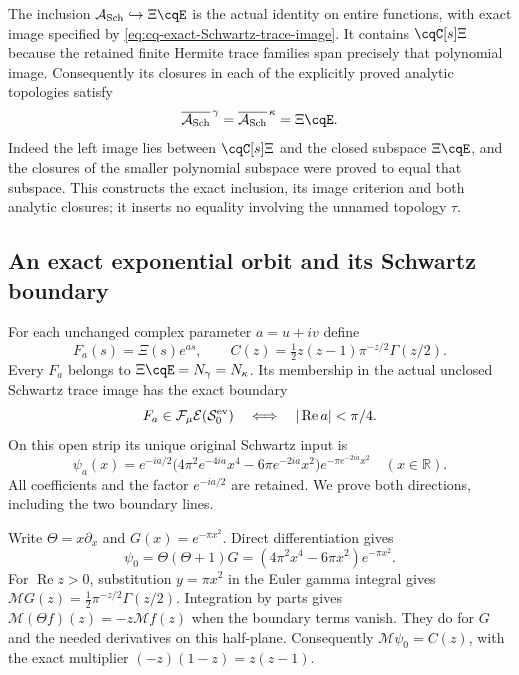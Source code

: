 The inclusion $\mathcal A_{\rm Sch}\hookrightarrow\Xi\cqE$
is the actual identity on entire functions, with exact image
specified by \eqref{eq:cq-exact-Schwartz-trace-image}. It contains
$\cqC[s]\Xi$ because the retained finite Hermite trace families
span precisely that polynomial image. Consequently its closures
in each of the explicitly proved analytic topologies satisfy
\begin{equation}\label{eq:cq-Schwartz-image-analytic-closures}
 \overline{\mathcal A_{\rm Sch}}^{\,\gamma}
 =\overline{\mathcal A_{\rm Sch}}^{\,\kappa}
 =\Xi\cqE.
\end{equation}
Indeed the left image lies between $\cqC[s]\Xi$ and the
closed subspace $\Xi\cqE$, and the closures of the smaller
polynomial subspace were proved to equal that subspace.
This constructs the exact inclusion, its image criterion and both
analytic closures; it inserts no equality involving the unnamed
topology $\tau$.

\subsection{An exact exponential orbit and its Schwartz boundary}
\label{sec:cq-exponential-trace}
For each unchanged complex parameter $a=u+iv$ define
\[
 F_a(s)=\Xi(s)e^{as},\qquad
 C(z)=\tfrac12 z(z-1)\pi^{-z/2}\Gamma(z/2).
\]
Every $F_a$ belongs to $\Xi\cqE=N_\gamma=N_\kappa$.
Its membership in the actual unclosed Schwartz trace image has
the exact boundary
\begin{equation}\label{eq:cq-exponential-Schwartz-domain}
 F_a\in\mathcal F_\mu\mathcal E(\mathcal S_0^{\rm ev})
 \quad\Longleftrightarrow\quad |\operatorname{Re}a|<\pi/4.
\end{equation}
On this open strip its unique original Schwartz input is
\begin{equation}\label{eq:cq-exponential-Schwartz-input}
 \psi_a(x)=e^{-ia/2}
   \bigl(4\pi^2e^{-4ia}x^4-6\pi e^{-2ia}x^2\bigr)
                    e^{-\pi e^{-2ia}x^2}\quad(x\in\mathbb R).
\end{equation}
All coefficients and the factor $e^{-ia/2}$ are retained.
We prove both directions, including the two boundary lines.

Write $\Theta=x\partial_x$ and $G(x)=e^{-\pi x^2}$. Direct
differentiation gives
\[
 \psi_0=\Theta(\Theta+1)G
       =(4\pi^2x^4-6\pi x^2)e^{-\pi x^2}.
\]
For $\operatorname{Re}z>0$, substitution $y=\pi x^2$ in the
Euler gamma integral gives
$\mathcal M G(z)=\frac12\pi^{-z/2}\Gamma(z/2)$.
Integration by parts gives
$\mathcal M(\Theta f)(z)=-z\mathcal M f(z)$ when the boundary
terms vanish. They do for $G$ and the needed derivatives on
this half-plane. Consequently $\mathcal M\psi_0=C(z)$, with
the exact multiplier $(-z)(1-z)=z(z-1)$.

